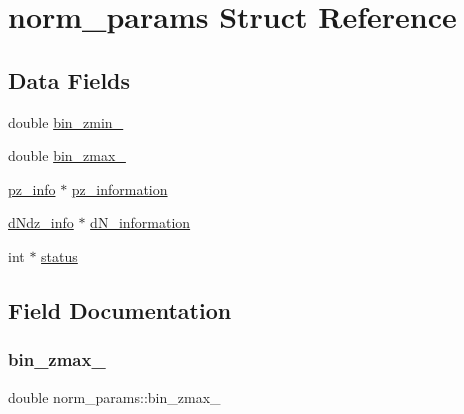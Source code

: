 \hypertarget{structnorm__params}{}\section{norm\+\_\+params Struct Reference}
\label{structnorm__params}
\subsection*{Data Fields}
\begin{DoxyCompactItemize}
\item 
double \mbox{\hyperlink{structnorm__params_a888ddc1606aa14d53cbb2c7eca195a6d}{bin\+\_\+zmin\+\_\+}}
\item 
double \mbox{\hyperlink{structnorm__params_a046ab0a0b51538c8bddc77968841900d}{bin\+\_\+zmax\+\_\+}}
\item 
\mbox{\hyperlink{structpz__info}{pz\+\_\+info}} $\ast$ \mbox{\hyperlink{structnorm__params_a8a5df03d132c8f5ccbbe582a38a91e52}{pz\+\_\+information}}
\item 
\mbox{\hyperlink{structd_ndz__info}{d\+Ndz\+\_\+info}} $\ast$ \mbox{\hyperlink{structnorm__params_ae0fd83adc177602d32bd25a2bf800f42}{d\+N\+\_\+information}}
\item 
int $\ast$ \mbox{\hyperlink{structnorm__params_af115f32a22df005a5723e2d7c905de51}{status}}
\end{DoxyCompactItemize}


\subsection{Field Documentation}
\mbox{\label{structnorm__params_a046ab0a0b51538c8bddc77968841900d}} 
\subsubsection{\texorpdfstring{bin\+\_\+zmax\+\_\+}{bin\_zmax\_}}
{\footnotesize\ttfamily double norm\+\_\+params\+::bin\+\_\+zmax\+\_\+}

\mbox{\label{structnorm__params_a888ddc1606aa14d53cbb2c7eca195a6d}} 
